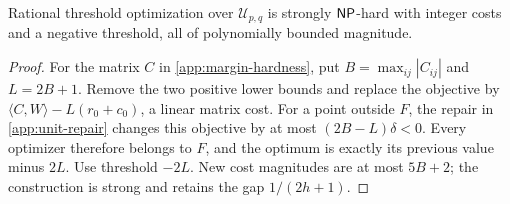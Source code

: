 \begin{corollary}
\label{app:unit-hardness}
Rational threshold optimization over $\mathcal U_{p,q}$ is strongly
$\mathsf{NP}$-hard with integer costs and a negative threshold, all of
polynomially bounded magnitude.
\end{corollary}
\begin{proof}
For the matrix $C$ in \cref{app:margin-hardness}, put
$B=\max_{ij}|C_{ij}|$ and $L=2B+1$. Remove the two positive lower
bounds and replace the objective by
$\langle C,W\rangle-L(r_0+c_0)$, a linear matrix cost.
For a point outside $F$, the repair in \cref{app:unit-repair} changes
this objective by at most $(2B-L)\delta<0$. Every optimizer therefore
belongs to $F$, and the optimum is exactly its previous value minus
$2L$. Use threshold $-2L$. New cost magnitudes are at most $5B+2$;
the construction is strong and retains the gap $1/(2h+1)$.
\end{proof}

